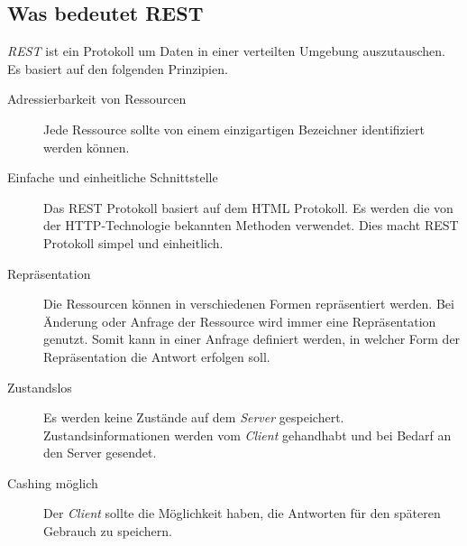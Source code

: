 \documentclass[12pt, paper=a4, bibtotoc, toc=listof, headsepline=true]{scrreprt}
\begin{document}
\subsection{Was bedeutet REST}
\emph{\ac{REST}} ist ein Protokoll um Daten in einer verteilten Umgebung auszutauschen. Es basiert auf den folgenden Prinzipien\cite[S.77]{chauhan2014asp}.
\begin{description}  
	\item  [Adressierbarkeit von Ressourcen]
	Jede Ressource sollte von einem einzigartigen Bezeichner identifiziert werden können.
	
	\item [Einfache und einheitliche Schnittstelle]
	Das \ac{REST} Protokoll basiert auf dem \ac{HTML} Protokoll. Es werden die von der \ac{HTTP}-Technologie bekannten Methoden verwendet. Dies macht \ac{REST} Protokoll 
	simpel und einheitlich.
	
	\item  [Repräsentation] 
	Die Ressourcen können in verschiedenen Formen repräsentiert werden. Bei Änderung oder Anfrage der Ressource wird immer eine Repräsentation genutzt. Somit kann in einer Anfrage definiert werden, in welcher Form der Repräsentation die Antwort erfolgen soll.
	
	\item [Zustandslos]
	Es werden keine Zustände auf dem \emph{Server} gespeichert. Zustandsinformationen werden vom \emph{Client} gehandhabt und bei Bedarf an den Server gesendet.
	
	\item [Cashing möglich]
	Der \emph{Client} sollte die Möglichkeit haben,  die Antworten für den späteren Gebrauch zu speichern.	
\end{description}
\end{document}
